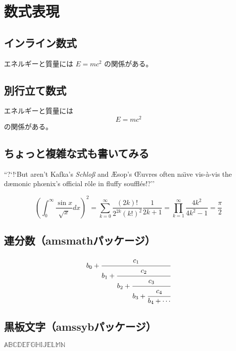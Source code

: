 \documentclass[fleqn]{ltjsarticle}
\begin{document}
\section*{数式表現}

\subsection*{インライン数式}

エネルギーと質量には $E=mc^2$ の関係がある。

\subsection*{別行立て数式}

エネルギーと質量には \[E=mc^2\] の関係がある。

\subsection*{ちょっと複雑な式も書いてみる}

``?`!`But aren't Kafka's \emph{Schlo{\ss}} and {\AE}sop's {\OE}uvres
often na\"{\i}ve vis-\`a-vis the d{\ae}monic ph{\oe}nix's
official r\^ole in fluffy souffl\'es!?''

\[
  \left( \int_0^\infty \frac{\sin x}{\sqrt x} dx \right)^2 =
  \sum_{k=0}^\infty \frac{(2k)!}{2^{2k}(k!)^2} \frac{1}{2k+1} =
  \prod_{k=1}^\infty \frac{4k^2}{4k^2-1} =
  \frac{\pi}{2}
\]

\subsection*{連分数（amsmathパッケージ）}
\begin{equation}
	b_0 + \cfrac{c_1}{b_1 +
	      \cfrac{c_2}{b_2 +
		  \cfrac{c_3}{b_3 +
		  \cfrac{c_4}{b_4 + \cdots}}}}
\end{equation}

\subsection*{黒板文字（amssybパッケージ）}

$\mathbb{ABCDEFGHIJELMN}$
\end{document}
